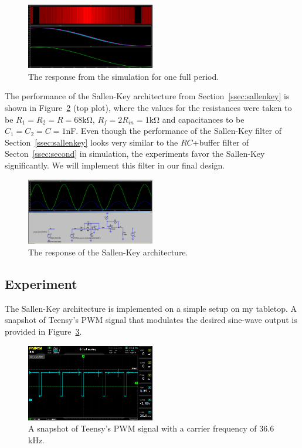 \begin{figure}[t]
\includegraphics[width=0.5\textwidth]{./figures/pwm_filtered_one_two_final_signal.png}
\caption{The response from the simulation for one full period.} 
\label{fig:response}
\end{figure}


The performance of the Sallen-Key architecture from Section~\ref{ssec:sallenkey}
is shown in Figure~\ref{fig:sallenkey_sim} (top plot), where the values for the
resistances were taken to be $R_1 = R_2 = R = 68$\unit{\kilo\ohm}, $R_f
= 2R_{in} = 1$\unit{\kilo\ohm} and capacitances to be $C_1 = C_2 = C =
1$\unit{\nano\farad}. Even though the performance of the Sallen-Key filter of
Section~\ref{ssec:sallenkey} looks very similar to the $RC$+buffer filter of
Secton~\ref{ssec:second} in simulation, the experiments favor the Sallen-Key
significantly. We will implement this filter in our final design.

\begin{figure}[tbh]
\includegraphics[width=0.5\textwidth]{./figures/sallenkey.png}
\caption{The response of the Sallen-Key architecture.}
\label{fig:sallenkey_sim}
\end{figure}


\vspace{-1em}
\subsection{Experiment}
\vspace{-1em}

The Sallen-Key architecture is implemented on a simple setup on my tabletop.
A snapshot of Teensy's PWM signal that modulates the desired sine-wave output is
provided in Figure~\ref{fig:teensy_pwm}.


\begin{figure}[bh]
    \includegraphics[width=0.5\textwidth]{./figures/teensy_pwm_osc.jpg}
    \caption{A snapshot of Teensy's PWM signal with a carrier frequency of
    $36.6$\unit{\kilo\hertz}.}
    \label{fig:teensy_pwm}
\end{figure}

